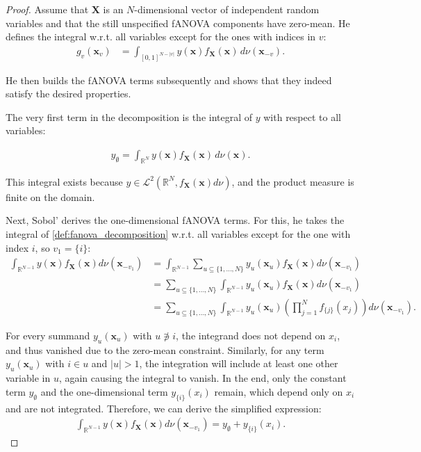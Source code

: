 \begin{proof}
    Assume that $\boldsymbol{X}$ is an $N$-dimensional vector of independent random variables and
    that the still unspecified fANOVA components have zero-mean. He defines the integral w.r.t. all variables except for the ones with indices in \( v \):
    \begin{align*}
        g_v(\boldsymbol{x}_v) &= \int_{[0, 1]^{N - |v|}} y(\boldsymbol{x}) f_{\boldsymbol{X}}(\boldsymbol{x}) \, d\nu (\boldsymbol{x}_{-v}).
    \end{align*}

He then builds the fANOVA terms subsequently and shows that they indeed satisfy the desired properties.\par
The very first term in the decomposition is the integral of \( y \) with respect to all variables:

\begin{align*}
    y_{\emptyset} = \int_{\mathbb{R}^N} y(\boldsymbol{x}) f_{\boldsymbol{X}}(\boldsymbol{x}) \, d\nu(\boldsymbol{x}).
\end{align*}

This integral exists because \( y \in \mathcal{L}^2(\mathbb{R}^N, f_{\boldsymbol{X}}(\boldsymbol{x}) d\nu) \), and the product measure is finite on the domain.

Next, Sobol' derives the one-dimensional fANOVA terms. For this, he takes the integral of \autoref{def:fanova_decomposition} w.r.t. all variables except for the one with index \( i \), so $v_1 = \{i\}$:
\begin{align*}
    \int_{\mathbb{R}^{N-1}} y(\boldsymbol{x}) f_{\boldsymbol{X}}(\boldsymbol{x}) d\nu (\boldsymbol{x}_{-v_1}) 
    &= \int_{\mathbb{R}^{N-1}} \sum_{u \subseteq \{1, \dots, N\}} y_{u}(\boldsymbol{x}_u) f_{\boldsymbol{X}}(\boldsymbol{x}) d\nu (\boldsymbol{x}_{-v_1}) \\[0.5em]
    &= \sum_{u \subseteq \{1, \dots, N\}} \int_{\mathbb{R}^{N-1}} y_{u}(\boldsymbol{x}_u) f_{\boldsymbol{X}}(\boldsymbol{x}) d\nu (\boldsymbol{x}_{-v_1}) \\[0.5em]
    &= \sum_{u \subseteq \{1, \dots, N\}} \int_{\mathbb{R}^{N-1}} y_{u}(\boldsymbol{x}_u) \left( \prod_{j=1}^N f_{{\{j\}}}(x_j) \right) d\nu (\boldsymbol{x}_{-v_1}).
\end{align*}

For every summand \( y_u(\boldsymbol{x}_u) \) with \( u \not\ni i \), the integrand does not depend on \( x_i \), and thus vanished due to the zero-mean constraint.
Similarly, for any term \( y_u(\boldsymbol{x}_u) \) with \( i \in u \) and \( |u| > 1 \), the integration will include at least one other variable in \( u \), again causing the integral to vanish.
In the end, only the constant term \( y_{\emptyset} \) and the one-dimensional term \( y_{\{i\}}(x_i) \) remain, which depend only on \( x_i \) and are not integrated.
Therefore, we can derive the simplified expression:
\begin{align*}
    \int_{\mathbb{R}^{N-1}} y(\boldsymbol{x}) f_{\boldsymbol{X}}(\boldsymbol{x}) d\nu (\boldsymbol{x}_{-v_1}) = y_{\emptyset} + y_{\{i\}}(x_i).
\end{align*}


\end{proof}
